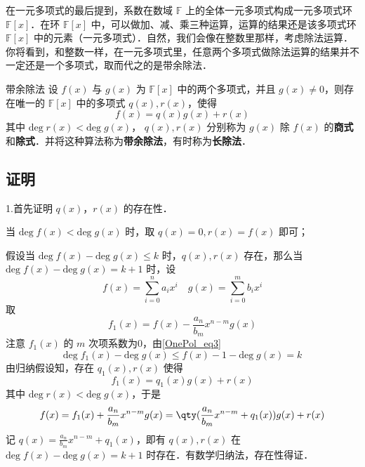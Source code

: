 
在一元多项式的最后提到，系数在数域 $\mathbb{F}$ 上的全体一元多项式构成一元多项式环 $\mathbb{F}[x]$．在环 $\mathbb{F}[x]$ 中，可以做加、减、乘三种运算，运算的结果还是该多项式环 $\mathbb{F}[x]$ 中的元素（一元多项式）．自然，我们会像在整数里那样，考虑除法运算．你将看到，和整数一样，在一元多项式里，任意两个多项式做除法运算的结果并不一定还是一个多项式，取而代之的是带余除法．
\begin{theorem}{带余除法}
设 $f(x)$ 与 $g(x)$ 为 $\mathbb{F}[x]$ 中的两个多项式，并且 $g(x)\neq 0$，则存在唯一的 $\mathbb{F}[x]$ 中的多项式 $q(x),r(x)$，使得
\begin{equation}
f(x)=q(x)g(x)+r(x)
\end{equation}
其中 $\mathrm{deg}\;r(x)<\mathrm{deg}\;g(x)$， $q(x),r(x)$ 分别称为 $g(x)$ 除 $f(x)$ 的\textbf{商式}和\textbf{除式}．并将这种算法称为\textbf{带余除法}，有时称为\textbf{长除法}．
\end{theorem}
\subsection{证明}
1.首先证明 $q(x)$，$r(x)$ 的存在性．

当 $\mathrm{deg}\;f(x)<\mathrm{deg}\;g(x)$ 时，取 $q(x)=0,r(x)=f(x)$ 即可；

假设当 $\mathrm{deg}\;f(x)-\mathrm{deg}\;g(x)\leq k$ 时，$q(x),r(x)$ 存在，那么当 $\mathrm{deg}\;f(x)-\mathrm{deg}\;g(x)=k+1$ 时，设
\begin{equation}
f(x)=\sum_{i=0}^n a_i x^i\quad g(x)=\sum_{i=0}^m b_ix^i
\end{equation}
取
\begin{equation}
f_1(x)=f(x)-\frac{a_n}{b_m}x^{n-m}g(x)
\end{equation}
注意 $f_1(x)$ 的 $m$ 次项系数为0，由\autoref{OnePol_eq3}~
\begin{equation}
\mathrm{deg}\;f_1(x)-\mathrm{deg}\;g(x)\leq f(x)-1-\mathrm{deg}\;g(x)=k
\end{equation}
由归纳假设知，存在 $q_1(x),r(x)$ 使得
\begin{equation}
f_1(x)=q_1(x)g(x)+r(x)
\end{equation}
其中 $\mathrm{deg}\;r(x)<\mathrm{deg}\;g(x)$，于是
\begin{equation}
f(x)=f_1(x)+\frac{a_n}{b_m}x^{n-m}g(x)=\qty(\frac{a_n}{b_m}x^{n-m}+q_1(x))g(x)+r(x)
\end{equation}
记 $q(x)=\frac{a_n}{b_m}x^{n-m}+q_1(x)$，即有 $q(x),r(x)$ 在 $\mathrm{deg}\;f(x)-\mathrm{deg}\;g(x)=k+1$ 时存在．有数学归纳法，存在性得证．

